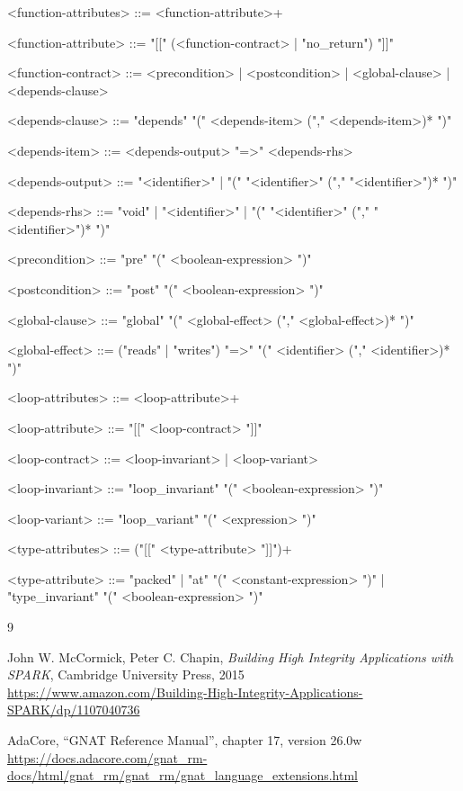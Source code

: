 \documentclass[11pt,letterpaper,twoside,openany]{book}
\begin{document}
\begin{grammar}
<function-attributes> ::=
   <function-attribute>+

<function-attribute> ::=
   "[[" (<function-contract> | "no_return") "]]"

<function-contract> ::=
   <precondition> | <postcondition> | <global-clause> | <depends-clause>

<depends-clause> ::=
   "depends" "(" <depends-item> ("," <depends-item>)* ")"

<depends-item> ::=
   <depends-output> "=>" <depends-rhs>

<depends-output> ::=
   "<identifier>" | "(" "<identifier>" ("," "<identifier>")* ")"

<depends-rhs> ::=
   "void" | "<identifier>" | "(" "<identifier>" ("," "<identifier>")* ")"

<precondition> ::= "pre" "(" <boolean-expression> ")"

<postcondition> ::= "post" "(" <boolean-expression> ")"

<global-clause> ::=
   "global" "(" <global-effect> ("," <global-effect>)* ")"

<global-effect> ::=
   ("reads" | "writes") "=>" "(" <identifier> ("," <identifier>)* ")"

<loop-attributes> ::=
   <loop-attribute>+

<loop-attribute> ::=
   "[[" <loop-contract> "]]"

<loop-contract> ::=
   <loop-invariant> | <loop-variant>

<loop-invariant> ::= "loop_invariant" "(" <boolean-expression> ")"

<loop-variant> ::= "loop_variant" "(" <expression> ")"

<type-attributes> ::=
   ("[[" <type-attribute> "]]")+

<type-attribute> ::=
   "packed" | "at" "(" <constant-expression> ")" |
   "type_invariant" "(" <boolean-expression> ")"

\end{grammar}

\begin{thebibliography}{9}

John W. McCormick, Peter C. Chapin, \emph{Building High Integrity Applications with SPARK}, Cambridge University Press, 2015 \\
\url{https://www.amazon.com/Building-High-Integrity-Applications-SPARK/dp/1107040736}

AdaCore, ``GNAT Reference Manual'', chapter 17, version 26.0w \\
\url{https://docs.adacore.com/gnat_rm-docs/html/gnat_rm/gnat_rm/gnat_language_extensions.html}

\end{thebibliography}
\end{document}
